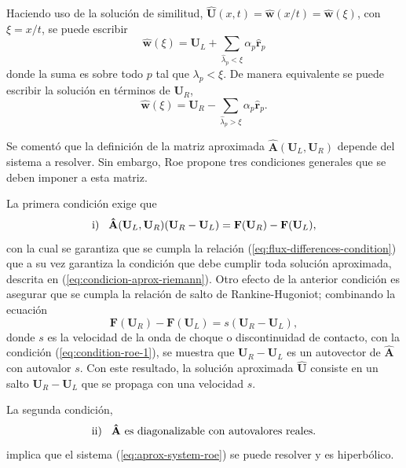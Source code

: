 Haciendo uso de la solución de similitud, $\mathbf{\hat{U}} (x,t) = \mathbf{\hat{w}}(x/t) = \mathbf{\hat{w}}(\xi)$, con $\xi = x/t$, se puede escribir
\begin{equation}
	\mathbf{\hat{w}}(\xi) = \mathbf{U}_L + \sum_{\hat{\lambda}_{p}<\xi}\alpha_{p}\mathbf{\hat{r}}_{p}
	\label{eq:w-linear-1}
\end{equation}
donde la suma es sobre todo $p$ tal que $\lambda_{p} < \xi$. De manera equivalente se puede escribir la solución en términos de $\mathbf{U}_R$,
\begin{equation}
	\mathbf{\hat{w}}(\xi) = \mathbf{U}_R - \sum_{\hat{\lambda}_{p}>\xi}\alpha_{p}\mathbf{\hat{r}}_{p}.
	\label{eq:w-linear-2}
\end{equation}

Se comentó que la definición de la matriz aproximada $\mathbf{\hat{A}}(\mathbf{U}_L, \mathbf{U}_R)$ depende del sistema a resolver. Sin embargo, Roe propone tres condiciones generales que se deben imponer a esta matriz. 

La primera condición exige que
\begin{equation}
	\text{i)}\hspace{3mm} \mathbf{\hat{A}}(\mathbf{U}_L, \mathbf{U}_R)(\mathbf{U}_R-\mathbf{U}_L) = \mathbf{F}(\mathbf{U}_R) - \mathbf{F}(\mathbf{U}_L),
	\label{eq:condition-roe-1}
\end{equation}
con la cual se garantiza que se cumpla la relación (\ref{eq:flux-differences-condition}) que a su vez garantiza la condición que debe cumplir toda solución aproximada, descrita en (\ref{eq:condicion-aprox-riemann}). Otro efecto de la anterior condición es asegurar que se cumpla la relación de salto de Rankine-Hugoniot; combinando la ecuación
\begin{equation}
	\mathbf{F}(\mathbf{U}_R) - \mathbf{F}(\mathbf{U}_L) = s(\mathbf{U}_R - \mathbf{U}_L),
\end{equation}
donde $s$ es la velocidad de la onda de choque o discontinuidad de contacto, con la condición (\ref{eq:condition-roe-1}), se muestra que $\mathbf{U}_R - \mathbf{U}_L$ es un autovector de $\mathbf{\hat{A}}$ con autovalor $s$. Con este resultado, la solución aproximada $\mathbf{\hat{U}}$ consiste en un salto $\mathbf{U}_R - \mathbf{U}_L$ que se propaga con una velocidad $s$.

La segunda condición,
\begin{equation}
	\text{ii)}\hspace{3mm} \mathbf{\hat{A}} \text{ es diagonalizable con autovalores reales.}
\end{equation}
implica que el sistema (\ref{eq:aprox-system-roe}) se puede resolver y es hiperbólico. 

